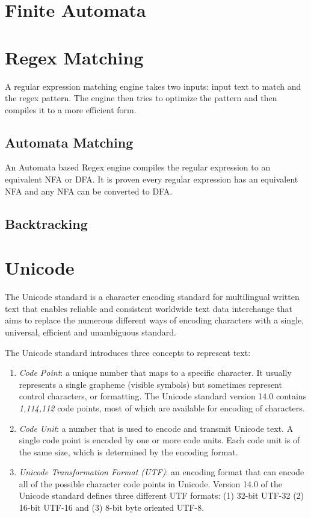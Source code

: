 \section{Finite Automata}

\section{Regex Matching}
A regular expression matching engine takes two inputs: input text to match and the regex pattern. The engine then tries to optimize the pattern and then compiles it to a more efficient form.

\subsection{Automata Matching}
An Automata based Regex engine compiles the regular expression to an equivalent NFA or DFA. It is proven every regular expression has an equivalent NFA and any NFA can be converted to DFA.

\subsection{Backtracking}

\section{Unicode}
The Unicode standard \cite{unicode} is a character encoding standard for multilingual written text that enables reliable and consistent worldwide text data interchange that aims to replace the numerous different ways of encoding characters with a single, universal, efficient and unambiguous standard.

The Unicode standard introduces three concepts to represent text:
\begin{enumerate}
    \item \textit{Code Point}: a unique number that maps to a specific character. It usually represents a single grapheme (visible symbols) but sometimes represent control characters, or formatting. The Unicode standard version 14.0 contains \textit{1,114,112} code points, most of which are available for encoding of characters.
    
    \item \textit{Code Unit}: a number that is used to encode and transmit Unicode text. A single code point is encoded by one or more code units. Each code unit is of the same size, which is determined by the encoding format.
    
    \item \textit{Unicode Transformation Format (UTF)}: an encoding format that can encode all of the possible character code points in Unicode. Version 14.0 of the Unicode standard defines three different UTF formats: (1) 32-bit UTF-32 (2) 16-bit UTF-16 and (3) 8-bit byte oriented UTF-8.
\end{enumerate}

